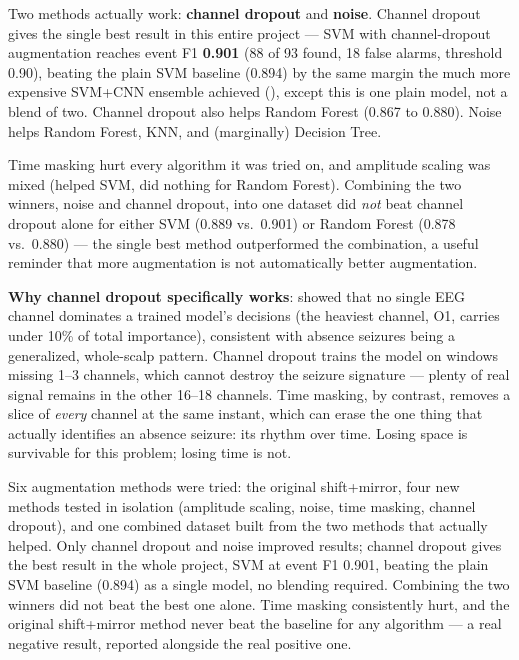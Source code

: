 Two methods actually work: \textbf{channel dropout} and \textbf{noise}. Channel dropout gives
the single best result in this entire project --- SVM with channel-dropout augmentation reaches
event F1 \textbf{0.901} (88 of 93 found, 18 false alarms, threshold 0.90), beating the plain SVM
baseline (0.894) by the same margin the much more expensive SVM+CNN ensemble achieved
(), except this is one plain model, not a blend of two. Channel dropout also
helps Random Forest (0.867 to 0.880). Noise helps Random Forest, KNN, and (marginally)
Decision Tree.

Time masking hurt every algorithm it was tried on, and amplitude scaling was mixed (helped SVM,
did nothing for Random Forest). Combining the two winners, noise and channel dropout, into one
dataset did \emph{not} beat channel dropout alone for either SVM (0.889 vs.\ 0.901) or Random
Forest (0.878 vs.\ 0.880) --- the single best method outperformed the combination, a useful
reminder that more augmentation is not automatically better augmentation.

\textbf{Why channel dropout specifically works}:  showed that no single
EEG channel dominates a trained model's decisions (the heaviest channel, O1, carries under 10\%
of total importance), consistent with absence seizures being a generalized, whole-scalp pattern.
Channel dropout trains the model on windows missing 1--3 channels, which cannot destroy the
seizure signature --- plenty of real signal remains in the other 16--18 channels. Time masking,
by contrast, removes a slice of \emph{every} channel at the same instant, which can erase the
one thing that actually identifies an absence seizure: its rhythm over time. Losing space is
survivable for this problem; losing time is not.

\begin{summarybox}
Six augmentation methods were tried: the original shift+mirror, four new methods tested in
isolation (amplitude scaling, noise, time masking, channel dropout), and one combined dataset
built from the two methods that actually helped. Only channel dropout and noise improved
results; channel dropout gives the best result in the whole project, SVM at event F1 0.901,
beating the plain SVM baseline (0.894) as a single model, no blending required. Combining the
two winners did not beat the best one alone. Time masking consistently hurt, and the original
shift+mirror method never beat the baseline for any algorithm --- a real negative result,
reported alongside the real positive one.
\end{summarybox}
